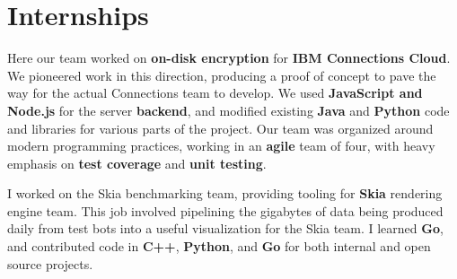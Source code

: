 \documentclass{my_resume}
\begin{document}
\section{Internships}
\begin{flushleft}
Here our team worked on \textbf{on-disk encryption} for \textbf{IBM Connections Cloud}.
We pioneered work in this direction, producing a proof of concept to pave the way for the actual Connections team to develop.
We used \textbf{JavaScript and Node.js} for the server \textbf{backend}, and modified existing \textbf{Java} and \textbf{Python} code and libraries for various parts of the project.
Our team was organized around modern programming practices, working in an \textbf{agile} team of four, with heavy emphasis on \textbf{test coverage} and \textbf{unit testing}.
\end{flushleft}
\begin{flushleft}
I worked on the Skia benchmarking team, providing tooling for \textbf{Skia} rendering engine team.
This job involved pipelining the gigabytes of data being produced daily from test bots into a useful visualization for the Skia team.
I learned \textbf{Go}, and contributed code in \textbf{C++}, \textbf{Python}, and \textbf{Go} for both internal and open source projects.
\end{flushleft}
\end{document}
